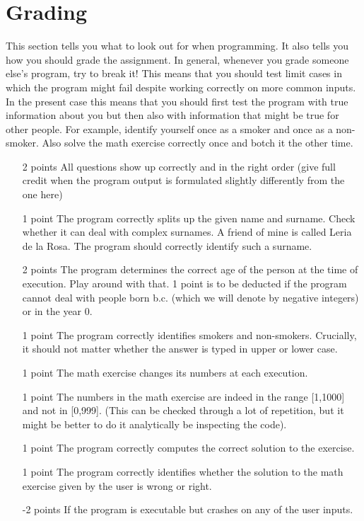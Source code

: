 \documentclass[11pt, leqno, a4paper]{article}
\begin{document}
\section{Grading}
This section tells you what to look out for when programming. It also tells you how you should grade the assignment. In general, whenever you grade 
someone else's program, try to break it! This means that you should test limit cases in which the program might fail despite working correctly
on more common inputs. In the present case this means that you should first test the program with true information about you but then also with
information that might be true for other people. For example, identify yourself once as a smoker and once as a non-smoker. Also solve the
math exercise correctly once and botch it the other time.

\begin{itemize}
\item[2 points] All questions show up correctly and in the right order (give full credit when the program output is formulated slightly differently from the one here)
\item[1 point] The program correctly splits up the given name and surname. Check whether it can deal with complex surnames. A friend of mine is called
Leria de la Rosa. The program should correctly identify such a surname.
\item[2 points] The program determines the correct age of the person at the time of execution. Play around with that. 1 point is to be deducted if the
program cannot deal with people born b.c. (which we will denote by negative integers) or in the year 0.
\item[1 point] The program correctly identifies smokers and non-smokers. Crucially, it should not matter whether the answer is typed in upper or lower case.
\item[1 point] The math exercise changes its numbers at each execution.
\item[1 point] The numbers in the math exercise are indeed in the range [1,1000] and not in [0,999]. (This can be checked through a lot of repetition, but 
it might be better to do it analytically be inspecting the code). 
\item[1 point] The program correctly computes the correct solution to the exercise.
\item[1 point] The program correctly identifies whether the solution to the math exercise given by the user is wrong or right.
\item[-2 points] If the program is executable but crashes on any of the user inputs.
\end{itemize}
\end{document}
